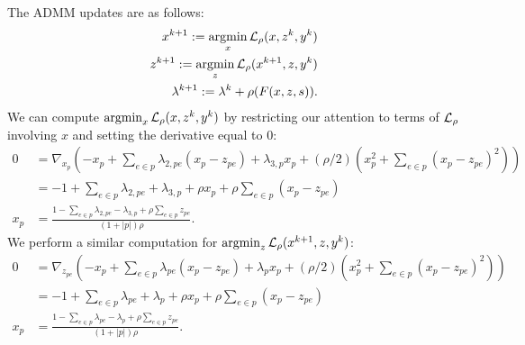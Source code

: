 \documentclass[11pt]{article}
\begin{document}
The ADMM updates are as follows:
\begin{equation}
    \begin{aligned}
        x^{k+1} := \operatorname*{argmin}_{x} \mathcal{L}_\rho(x,z^k,y^k)\\
        z^{k+1} := \operatorname*{argmin}_{z} \mathcal{L}_\rho(x^{k+1},z,y^k)\\
        \lambda^{k+1} := \lambda^k + \rho(F(x,z,s)).
    \end{aligned}
\end{equation}
We can compute $\operatorname*{argmin}_{x} \mathcal{L}_\rho(x,z^k,y^k)$ by restricting our
attention to terms of $\mathcal{L}_\rho$ involving $x$ and setting the derivative equal to 0:
\begin{align*}
0
&= \nabla_{x_p}(-x_p + \sum_{e\in p}\lambda_{2,pe}(x_p - z_{pe}) + \lambda_{3,p} x_p
+ (\rho/2)(x_p^2 + \sum_{e \in p}(x_p - z_{pe})^2))\\
&= -1 + \sum_{e \in p}\lambda_{2,pe} + \lambda_{3,p} + \rho x_p + \rho\sum_{e \in p} (x_p - z_{pe})\\
x_p &= \frac{1 - \sum_{e \in p}\lambda_{2,pe} - \lambda_{3,p} + \rho \sum_{e\in p} z_{pe}}
{(1 + |p|)\rho}.
\end{align*}
We perform a similar computation for $\operatorname*{argmin}_{z} \mathcal{L}_\rho(x^{k+1},z,y^k)$:
\begin{align*}
0
&= \nabla_{z_{pe}}(-x_p + \sum_{e\in p}\lambda_{pe}(x_p - z_{pe}) + \lambda_p x_p
+ (\rho/2)(x_p^2 + \sum_{e \in p}(x_p - z_{pe})^2))\\
&= -1 + \sum_{e \in p}\lambda_{pe} + \lambda_p + \rho x_p + \rho\sum_{e \in p} (x_p - z_{pe})\\
x_p &= \frac{1 - \sum_{e \in p}\lambda_{pe} - \lambda_p + \rho \sum_{e\in p} z_{pe}}
{(1 + |p|)\rho}.
\end{align*}
\end{document}
